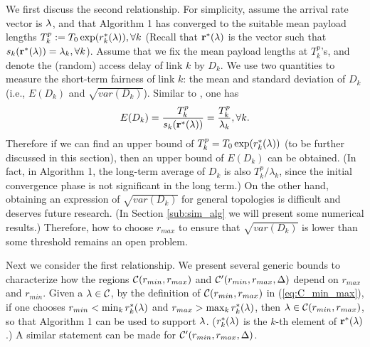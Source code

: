 \documentclass{IEEEtran}
\begin{document}
We first discuss the second relationship. For simplicity, assume the
arrival rate vector is ${\bf \lambda}$, and that Algorithm 1 has
converged to the suitable mean payload lengths $T_{k}^{p}:=T_{0}\exp(r_{k}^{*}({\bf \lambda})),\forall k$
(Recall that ${\bf r}^{*}({\bf \lambda})$ is the vector such that
$s_{k}({\bf r}^{*}({\bf \lambda}))=\lambda_{k},\forall k$). Assume
that we fix the mean payload lengths at $T_{k}^{p}$'s, and denote
the (random) access delay of link $k$ by $D_{k}$. We use two quantities
to measure the short-term fairness of link $k$: the mean and standard
deviation of $D_{k}$ (i.e., $E(D_{k})$ and $\sqrt{var(D_{k})}$).
Similar to \cite{conv_MS}, one has\[
E(D_{k})=\frac{T_{k}^{p}}{s_{k}({\bf r}^{*}({\bf \lambda}))}=\frac{T_{k}^{p}}{\lambda_{k}},\forall k.\]
Therefore if we can find an upper bound of $T_{k}^{p}=T_{0}\exp(r_{k}^{*}({\bf \lambda}))$
(to be further discussed in this section), then an upper bound of
$E(D_{k})$ can be obtained. (In fact, in Algorithm 1, the long-term
average of $D_{k}$ is also $T_{k}^{p}/\lambda_{k}$, since the initial
convergence phase is not significant in the long term.) On the other
hand, obtaining an expression of $\sqrt{var(D_{k})}$ for general
topologies is difficult and deserves future research. (In Section
\ref{sub:sim_alg} we will present some numerical results.) Therefore,
how to choose $r_{max}$ to ensure that $\sqrt{var(D_{k})}$ is lower
than some threshold remains an open problem.

Next we consider the first relationship. We present several generic
bounds to characterize how the regions ${\cal C}(r_{min},r_{max})$
and ${\cal C}'(r_{min},r_{max},\Delta)$ depend on $r_{max}$ and
$r_{min}$. Given a ${\bf \lambda}\in{\cal C}$, by the definition
of ${\cal C}(r_{min},r_{max})$ in (\ref{eq:C_min_max}), if one chooses
$r_{min}<\min_{k}r_{k}^{*}({\bf \lambda})$ and $r_{max}>\max_{k}r_{k}^{*}({\bf \lambda})$,
then ${\bf \lambda}\in{\cal C}(r_{min},r_{max})$, so that Algorithm
1 can be used to support ${\bf \lambda}$. ($r_{k}^{*}({\bf \lambda})$
is the $k$-th element of ${\bf r}^{*}({\bf \lambda})$.) A similar
statement can be made for ${\cal C}'(r_{min},r_{max},\Delta)$. 
\end{document}
